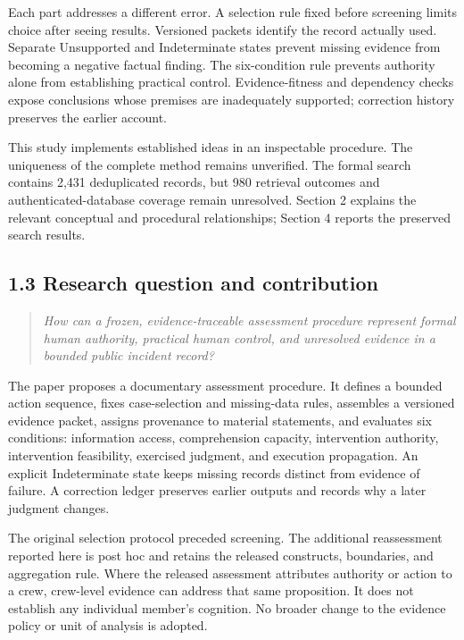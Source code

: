 \documentclass[11pt]{article}
\begin{document}
Each part addresses a different error. A selection rule fixed before screening limits choice after seeing results. Versioned packets identify the record actually used. Separate Unsupported and Indeterminate states prevent missing evidence from becoming a negative factual finding. The six-condition rule prevents authority alone from establishing practical control. Evidence-fitness and dependency checks expose conclusions whose premises are inadequately supported; correction history preserves the earlier account.

This study implements established ideas in an inspectable procedure. The uniqueness of the complete method remains unverified. The formal search contains 2,431 deduplicated records, but 980 retrieval outcomes and authenticated-database coverage remain unresolved. Section 2 explains the relevant conceptual and procedural relationships; Section 4 reports the preserved search results.

\subsection*{1.3 Research question and contribution}

\begin{quote}\itshape How can a frozen, evidence-traceable assessment procedure represent formal human authority, practical human control, and unresolved evidence in a bounded public incident record?\end{quote}

The paper proposes a documentary assessment procedure. It defines a bounded action sequence, fixes case-selection and missing-data rules, assembles a versioned evidence packet, assigns provenance to material statements, and evaluates six conditions: information access, comprehension capacity, intervention authority, intervention feasibility, exercised judgment, and execution propagation. An explicit Indeterminate state keeps missing records distinct from evidence of failure. A correction ledger preserves earlier outputs and records why a later judgment changes.

The original selection protocol preceded screening. The additional reassessment reported here is post hoc and retains the released constructs, boundaries, and aggregation rule. Where the released assessment attributes authority or action to a crew, crew-level evidence can address that same proposition. It does not establish any individual member's cognition. No broader change to the evidence policy or unit of analysis is adopted.
\end{document}
